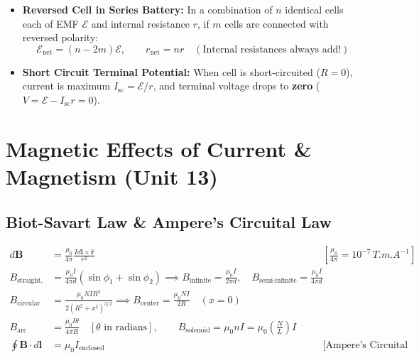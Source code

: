 \documentclass[11pt,a4paper]{article}
\begin{document}
\begin{trapbox}
\begin{itemize}
  \item \textbf{Reversed Cell in Series Battery:} In a combination of $n$ identical cells each of EMF $\mathcal{E}$ and internal resistance $r$, if $m$ cells are connected with reversed polarity:
  \begin{equation*}
    \mathcal{E}_{\text{net}} = (n - 2m)\mathcal{E}, \qquad r_{\text{net}} = n r \quad (\text{Internal resistances always add!})
  \end{equation*}
  \item \textbf{Short Circuit Terminal Potential:} When cell is short-circuited ($R=0$), current is maximum $I_{\text{sc}} = \mathcal{E}/r$, and terminal voltage drops to \textbf{zero} ($V = \mathcal{E} - I_{\text{sc}}r = 0$).
\end{itemize}
\end{trapbox}

\newpage

\section{Magnetic Effects of Current \& Magnetism (Unit 13)}

\subsection{Biot-Savart Law \& Ampere's Circuital Law}

\begin{formulabox}
\begin{align}
  d\mathbf{B} &= \frac{\mu_0}{4\pi}\frac{I d\mathbf{l}\times\hat{\mathbf{r}}}{r^2} && \left[\frac{\mu_0}{4\pi} = 10^{-7}\,\si{T.m.A^{-1}}\right] \\
  B_{\text{straight, finite}} &= \frac{\mu_0 I}{4\pi d}(\sin\phi_1 + \sin\phi_2) \implies B_{\text{infinite}} = \frac{\mu_0 I}{2\pi d}, \quad B_{\text{semi-infinite}} = \frac{\mu_0 I}{4\pi d} \\
  B_{\text{circular coil, axis}} &= \frac{\mu_0 N I R^2}{2(R^2 + x^2)^{3/2}} \implies B_{\text{center}} = \frac{\mu_0 N I}{2R} \quad (x = 0) \\
  B_{\text{arc}} &= \frac{\mu_0 I \theta}{4\pi R} \quad [\theta \text{ in radians}], \qquad B_{\text{solenoid}} = \mu_0 n I = \mu_0 \left(\frac{N}{L}\right)I \\
  \oint \mathbf{B}\cdot d\mathbf{l} &= \mu_0 I_{\text{enclosed}} && \text{[Ampere's Circuital Law]}
\end{align}
\end{formulabox}
\end{document}
